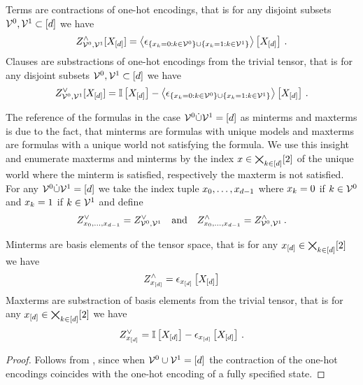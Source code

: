 \begin{lemma}
    \label{lem:termClauseOneHot}
    Terms are contractions of one-hot encodings, that is for any disjoint subsets $\mathcal{V}^{0},\mathcal{V}^{1}\subset[d]$ we have
    \[ Z^{\land}_{\mathcal{V}^{0},\mathcal{V}^{1}}[X_{[d]}] = \left\langle \epsilon_{\{x_{k}=0 : k\in\mathcal{V}^{0} \} \cup \{x_{k}=1 : k\in\mathcal{V}^{1}\}}\right\rangle \left[ X_{[d]} \right] \, . \]
    Clauses are substractions of one-hot encodings from the trivial tensor, that is for any disjoint subsets $\mathcal{V}^{0},\mathcal{V}^{1}\subset[d]$ we have
    \[ Z^{\lor}_{\mathcal{V}^{0},\mathcal{V}^{1}}[X_{[d]}] =
    \mathbb{I}\left[X_{[d]}\right] -
    \left\langle \epsilon_{\{x_{k}=0 : k\in\mathcal{V}^{0} \} \cup \{x_{k}=1 : k\in\mathcal{V}^{1}\}}\right\rangle \left[ X_{[d]} \right] \, . \]
\end{lemma}


%
The reference of the formulas in the case $\mathcal{V}^{0}\dot{\cup}\mathcal{V}^{1} = [d]$ as minterms and maxterms is due to the fact, that minterms are formulas with unique models and maxterms are formulas with a unique world not satisfying the formula.
We use this insight and enumerate maxterms and minterms by the index $x\in\bigtimes_{k\in[d]}[2]$ of the unique world where the minterm is satisfied, respectively the maxterm is not satisfied.
For any $\mathcal{V}^{0}\dot{\cup}\mathcal{V}^{1} = [d]$ we take the index tuple $x_{0},\ldots,x_{d-1}$ where $x_{k}=0$ if $k\in\mathcal{V}^{0}$ and $x_{k}=1$ if $k\in\mathcal{V}^{1}$ and define
\begin{align*}
    Z^{\lor}_{x_{0},\ldots,x_{d-1}} = Z^{\lor}_{\mathcal{V}^{0},\mathcal{V}^{1}} \quad \text{and} \quad Z^{\land}_{x_{0},\ldots,x_{d-1}} = Z^{\land}_{\mathcal{V}^{0},\mathcal{V}^{1}} \, .
\end{align*}


\begin{corollary}
    Minterms are basis elements of the tensor space, that is for any $x_{[d]}\in\bigtimes_{k\in[d]}[2]$ we have
    \begin{align*}
        Z^{\land}_{x_{[d]}} = \epsilon_{x_{[d]}}\left[X_{[d]}\right]
    \end{align*}
    Maxterms are substraction of basis elements from the trivial tensor, that is for any $x_{[d]}\in\bigtimes_{k\in[d]}[2]$ we have
    \begin{align*}
        Z^{\lor}_{x_{[d]}} = \mathbb{I}\left[X_{[d]}\right] - \epsilon_{x_{[d]}}\left[X_{[d]}\right]  \, .
    \end{align*}
\end{corollary}
\begin{proof}
    Follows from , since when $\mathcal{V}^{0}\cup\mathcal{V}^{1} = [d]$ the contraction of the one-hot encodings coincides with the one-hot encoding of a fully specified state.
\end{proof}


